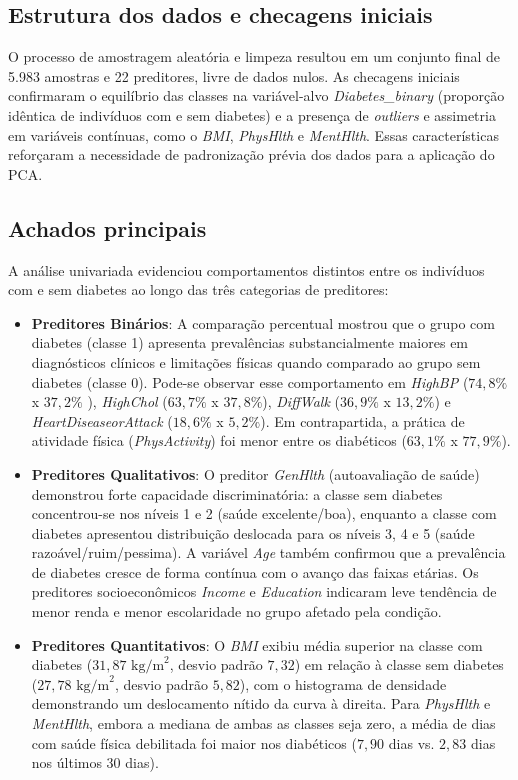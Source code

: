 \documentclass[conference]{IEEEtran}
\begin{document}
\subsection{Estrutura dos dados e checagens iniciais}
O processo de amostragem aleatória e limpeza resultou em um conjunto final de 5.983 amostras e 22 preditores, livre de dados nulos. As checagens iniciais confirmaram o equilíbrio das classes na variável-alvo \textit{Diabetes\_binary} (proporção idêntica de indivíduos com e sem diabetes) e a presença de \textit{outliers} e assimetria em variáveis contínuas, como o \textit{BMI}, \textit{PhysHlth} e \textit{MentHlth}. Essas características reforçaram a necessidade de padronização prévia dos dados para a aplicação do PCA.

\subsection{Achados principais}

A análise univariada evidenciou comportamentos distintos entre os indivíduos com e sem diabetes ao longo das três categorias de preditores:

\begin{itemize}
    \item \textbf{Preditores Binários}: A comparação percentual mostrou que o grupo com diabetes (classe 1) apresenta prevalências substancialmente maiores em diagnósticos clínicos e limitações físicas quando comparado ao grupo sem diabetes (classe 0). Pode-se observar esse comportamento em \textit{HighBP} ($74,8\%$  x $37,2\%$ ), \textit{HighChol} ($63,7\%$ x $37,8\%$), \textit{DiffWalk} ($36,9\%$ x $13,2\%$) e \textit{HeartDiseaseorAttack} ($18,6\%$ x $5,2\%$). Em contrapartida, a prática de atividade física (\textit{PhysActivity}) foi menor entre os diabéticos ($63,1\%$ x $77,9\%$).
    
    \item \textbf{Preditores Qualitativos}: O preditor \textit{GenHlth} (autoavaliação de saúde) demonstrou forte capacidade discriminatória: a classe sem diabetes concentrou-se nos níveis 1 e 2 (saúde excelente/boa), enquanto a classe com diabetes apresentou distribuição deslocada para os níveis 3, 4 e 5 (saúde razoável/ruim/pessima). A variável \textit{Age} também confirmou que a prevalência de diabetes cresce de forma contínua com o avanço das faixas etárias. Os preditores socioeconômicos \textit{Income} e \textit{Education} indicaram leve tendência de menor renda e menor escolaridade no grupo afetado pela condição.

    \item \textbf{Preditores Quantitativos}: O \textit{BMI} exibiu média superior na classe com diabetes ($31,87 \text{ kg/m}^2$, desvio padrão $7,32$) em relação à classe sem diabetes ($27,78 \text{ kg/m}^2$, desvio padrão $5,82$), com o histograma de densidade demonstrando um deslocamento nítido da curva à direita. Para \textit{PhysHlth} e \textit{MentHlth}, embora a mediana de ambas as classes seja zero, a média de dias com saúde física debilitada foi maior nos diabéticos ($7,90$ dias vs. $2,83$ dias nos últimos 30 dias).
\end{itemize}
\end{document}
